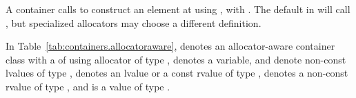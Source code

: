 \enternote
A container calls 
to construct an element at  using ,
with .
The default  in  will
call ,
but specialized allocators may choose a different definition.
\exitnote

\pnum
In Table~\ref{tab:containers.allocatoraware},  denotes an allocator-aware container class
with a  of  using allocator of type ,  denotes a
variable,
 and  denote non-const lvalues of type ,
 denotes an lvalue or a const rvalue of type ,  denotes a
non-const rvalue of type , and  is a value of type .


